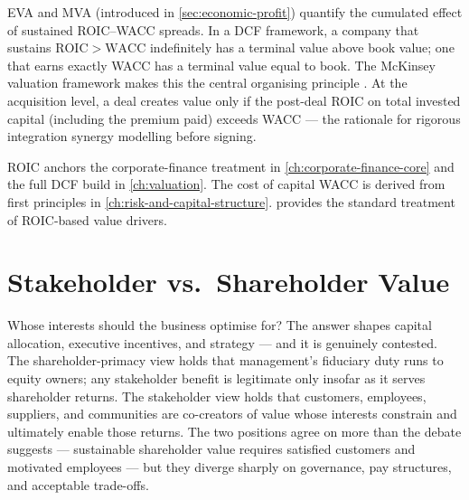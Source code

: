 EVA and MVA (introduced in \cref{sec:economic-profit}) quantify the cumulated effect of
sustained ROIC--WACC spreads. In a DCF framework, a company that sustains \(\mathrm{ROIC}>\mathrm{WACC}\)
indefinitely has a terminal value above book value; one that earns exactly WACC has a terminal
value equal to book. The McKinsey valuation framework makes this the central organising
principle \parencite{damodaran2012}. At the acquisition level, a deal creates value only if the
post-deal ROIC on total invested capital (including the premium paid) exceeds WACC --- the
rationale for rigorous integration synergy modelling before signing.

ROIC anchors the corporate-finance treatment in \cref{ch:corporate-finance-core} and the full DCF
build in \cref{ch:valuation}. The cost of capital WACC is derived from first principles in
\cref{ch:risk-and-capital-structure}. \textcite{damodaran2012} provides the standard treatment of
ROIC-based value drivers.

\section{Stakeholder vs.\ Shareholder Value}\label{sec:stakeholder-value}

Whose interests should the business optimise for? The answer shapes capital allocation, executive
incentives, and strategy --- and it is genuinely contested. The shareholder-primacy view holds
that management's fiduciary duty runs to equity owners; any stakeholder benefit is legitimate
only insofar as it serves shareholder returns. The stakeholder view holds that customers,
employees, suppliers, and communities are co-creators of value whose interests constrain and
ultimately enable those returns. The two positions agree on more than the debate suggests ---
sustainable shareholder value requires satisfied customers and motivated employees --- but they
diverge sharply on governance, pay structures, and acceptable trade-offs.

